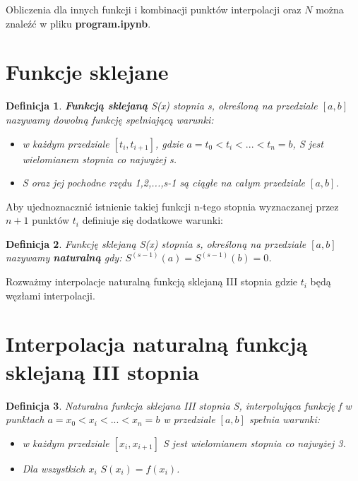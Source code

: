 \documentclass{article}
\newtheorem{defi}{Definicja}
\begin{document}
Obliczenia dla innych funkcji i kombinacji punktów interpolacji oraz $N$ można znaleźć w pliku \textbf{program.ipynb}.

\section{Funkcje sklejane}


\begin{defi}
	\textbf{Funkcją sklejaną} S(x) stopnia s, określoną na przedziale $[a,b]$ nazywamy dowolną funkcję spełniającą warunki:
	
	\begin{itemize}
		\item w każdym przedziale $[t_i,t_{i+1}]$, gdzie $a = t_0 < t_i <...<t_n = b$, S jest wielomianem stopnia co najwyżej s.
		\item S oraz jej pochodne rzędu 1,2,...,s-1 są ciągłe na całym przedziale $[a,b]$.
	\end{itemize}
\end{defi}

\noindent Aby ujednoznacznić istnienie takiej funkcji n-tego stopnia wyznaczanej przez $n+1$ punktów $t_i$ definiuje się dodatkowe warunki:

\begin{defi}
	Funkcję sklejaną S(x) stopnia s, określoną na przedziale $[a,b]$
	nazywamy \textbf{naturalną} gdy:
	$S^{(s-1)}(a) = S^{(s-1)}(b) = 0$.
\end{defi}

Rozważmy interpolacje naturalną funkcją sklejaną III stopnia gdzie $t_i$ będą węzłami interpolacji.

\section{Interpolacja naturalną funkcją sklejaną III stopnia}

\begin{defi}
	Naturalna funkcja sklejana III stopnia S, interpolująca funkcję f w punktach $a = x_0 < x_i <...<x_n = b$ w przedziale $[a,b]$ spełnia warunki:
	
	\begin{itemize}
		\item w każdym przedziale $[x_i,x_{i+1}]$ S jest wielomianem stopnia co najwyżej 3.
		\item Dla wszystkich $x_i$ $S(x_i) = f(x_i)$.
	\end{itemize}
	
\end{defi}
\end{document}
